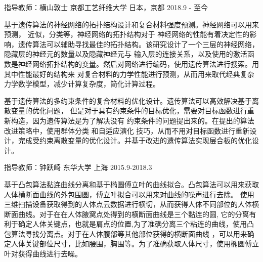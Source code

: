 

\begin{cventries}

  \cventry
    {指导教师：横山敦士} %
    {京都工艺纤维大学} %
    {日本，京都} %
    {2018.9 - 至今} %
    {
      \begin{cvitems} %
        \item {
基于遗传算法的神经网络的拓扑结构设计和复合材料强度预测。神经网络可以用来预测，
近似，分类等，神经网络的拓扑结构对于
神经网络的性能有着决定性的影响，遗传算法可以辅助寻找最佳的拓扑结构。该研究设计了一个三层的神经网络，隐藏层的神经元的数量以及隐藏神经元与
输入层的连接关系，以及使用的激活函数是神经网络拓扑结构的变量。然后对网络进行编码，使用遗传算法进行搜索。用其中性能最好的结构来
对复合材料的力学性能进行预测，从而用来取代经典复杂力学数学模型，减少计算复杂度，简化计算过程。}
        \item {基于遗传算法的多约束条件的复合材料的优化设计。遗传算法可以高效解决基于离散变量的优化问题，
	但是对于具有约束条件的目标优化，需要对目标函数进行重新构造，因为遗传算法是为了解决没有
	约束条件的问题提出来的。在提出的算法改进策略中，使用群体分类
	和自适应演化 
	技巧，从而不用对目标函数进行重新设计，完成受约束离散变量的优化设计。并基于改进的遗传算法实现层合板的优化设计。}
      \end{cvitems}
    }

  \cventry
    {指导教师：钟跃崎} %
    {东华大学} %
    {上海} %
    {2015.9-2018.3} %
    {
      \begin{cvitems} %
        \item
			{基于凸包算法黏连曲线分离和基于椭圆傅立叶的曲线拟合。凸包算法可以用来获取人体横断面曲线的外包围圆，傅立叶拟合可以用来对曲线的噪声进行去除。
			使用三维扫描设备获取得到的人体点云数据进行横切，从而获得人体不同部位的人体横断面曲线。对于在在人体腋窝点处得到的横断面曲线是三个黏连的圆,
			它的分离有利于确定人体关键点，也就是肩点的位置,为了准确分离三个粘连的曲线，使用凸包算法寻找分离点。对于在人体腹部等其他部位获得的横断面曲线
			，可以用来确定人体关键部位尺寸，比如腰围，胸围等。为了准确获取人体尺寸，使用椭圆傅立叶对获得曲线进行去噪。
}
      \end{cvitems}
    }


\end{cventries}
